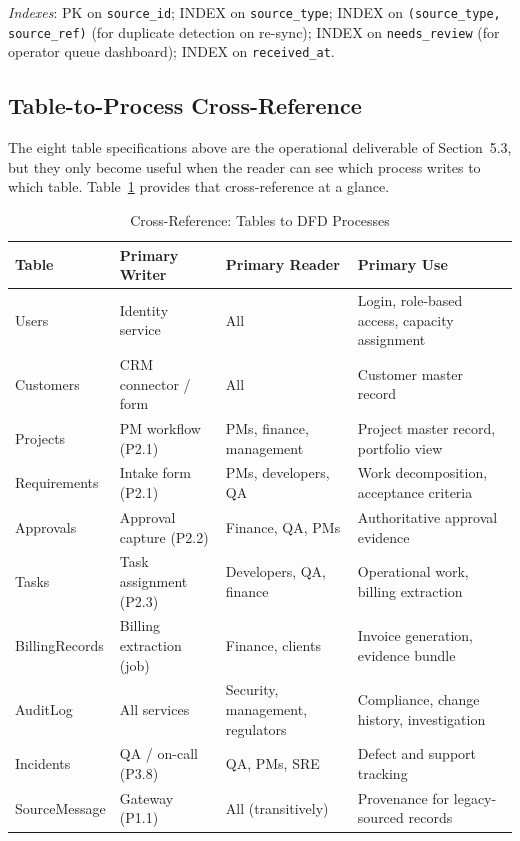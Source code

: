 \documentclass[12pt,a4paper]{report}
\begin{document}
\noindent \emph{Indexes}: PK on \texttt{source\_id}; INDEX on
\texttt{source\_type}; INDEX on \texttt{(source\_type, source\_ref)} (for
duplicate detection on re-sync); INDEX on \texttt{needs\_review} (for
operator queue dashboard); INDEX on \texttt{received\_at}.

\subsection{Table-to-Process Cross-Reference}
\label{sec:design-tables-xref}

The eight table specifications above are the operational deliverable of
Section~5.3, but they only become useful when the reader can see which process
writes to which table. Table~\ref{tab:tables-xref} provides that cross-reference
at a glance.

\begin{table}[H]
\centering
\caption{Cross-Reference: Tables to DFD Processes}
\label{tab:tables-xref}
\small
\renewcommand{\arraystretch}{1.18}
\begin{tabularx}{\textwidth}{>{\raggedright\arraybackslash}p{3.4cm}
                                >{\raggedright\arraybackslash}p{4.6cm}
                                >{\raggedright\arraybackslash}p{4.0cm}
                                >{\raggedright\arraybackslash}X}
\toprule
\textbf{Table} & \textbf{Primary Writer} & \textbf{Primary Reader} & \textbf{Primary Use} \\
\midrule
Users                 & Identity service            & All                       & Login, role-based access, capacity assignment \\
Customers             & CRM connector / form         & All                       & Customer master record \\
Projects              & PM workflow (P2.1)          & PMs, finance, management  & Project master record, portfolio view \\
Requirements          & Intake form (P2.1)          & PMs, developers, QA       & Work decomposition, acceptance criteria \\
Approvals             & Approval capture (P2.2)     & Finance, QA, PMs          & Authoritative approval evidence \\
Tasks                 & Task assignment (P2.3)      & Developers, QA, finance   & Operational work, billing extraction \\
BillingRecords        & Billing extraction (job)    & Finance, clients          & Invoice generation, evidence bundle \\
AuditLog              & All services                & Security, management, regulators & Compliance, change history, investigation \\
Incidents             & QA / on-call (P3.8)         & QA, PMs, SRE              & Defect and support tracking \\
SourceMessage         & Gateway (P1.1)              & All (transitively)        & Provenance for legacy-sourced records \\
\bottomrule
\end{tabularx}
\end{table}
\end{document}
